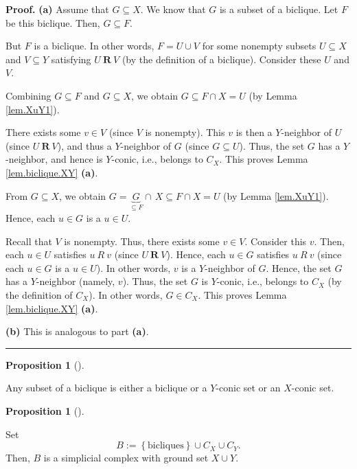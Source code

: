 \documentclass[numbers=enddot,12pt,final,onecolumn,notitlepage]{scrartcl}%
\theoremstyle{definition}
\newtheorem{prop}[theo]{Proposition}
\newenvironment{proposition}[1][]
{\begin{prop}[#1]\begin{leftbar}}
{\end{leftbar}\end{prop}}
\newenvironment{proof}[1][Proof]{\noindent\textbf{#1.} }{\ \rule{0.5em}{0.5em}}
\newenvironment{verlong}{}{}
\newenvironment{vershort}{}{}
\newenvironment{noncompile}{}{}
\begin{document}
\begin{proof}
\textbf{(a)} Assume that $G\subseteq X$. We know that $G$ is a subset of a
biclique. Let $F$ be this biclique. Then, $G\subseteq F$.

But $F$ is a biclique. In other words, $F=U\cup V$ for some nonempty subsets
$U\subseteq X$ and $V\subseteq Y$ satisfying $U\ \mathbf{R}\ V$ (by the
definition of a biclique). Consider these $U$ and $V$.

\begin{vershort}
Combining $G\subseteq F$ and $G\subseteq X$, we obtain $G\subseteq F\cap X=U$
(by Lemma \ref{lem.XuY1}).

There exists some $v\in V$ (since $V$ is nonempty). This $v$ is then a
$Y$-neighbor of $U$ (since $U\ \mathbf{R}\ V$), and thus a $Y$-neighbor of $G$
(since $G\subseteq U$). Thus, the set $G$ has a $Y$-neighbor, and hence is
$Y$-conic, i.e., belongs to $C_{X}$. This proves Lemma \ref{lem.biclique.XY}
\textbf{(a)}.
\end{vershort}

\begin{verlong}
From $G\subseteq X$, we obtain $G=\underbrace{G}_{\subseteq F}\cap\,X\subseteq
F\cap X=U$ (by Lemma \ref{lem.XuY1}). Hence, each $u\in G$ is a $u\in U$.

Recall that $V$ is nonempty. Thus, there exists some $v\in V$. Consider this
$v$. Then, each $u\in U$ satisfies $u\ R\ v$ (since $U\ \mathbf{R}\ V$).
Hence, each $u\in G$ satisfies $u\ R\ v$ (since each $u\in G$ is a $u\in U$).
In other words, $v$ is a $Y$-neighbor of $G$. Hence, the set $G$ has a
$Y$-neighbor (namely, $v$). Thus, the set $G$ is $Y$-conic, i.e., belongs to
$C_{X}$ (by the definition of $C_{X}$). In other words, $G\in C_{X}$. This
proves Lemma \ref{lem.biclique.XY} \textbf{(a)}.
\end{verlong}

\textbf{(b)} This is analogous to part \textbf{(a)}.
\end{proof}

\begin{noncompile}


\begin{proposition}
\label{prop.biclique.sub}Any subset of a biclique is either a biclique or a
$Y$-conic set or an $X$-conic set.
\end{proposition}
\end{noncompile}

\begin{proposition}
\label{prop.bicl-comp}Set%
\[
B:=\left\{  \text{bicliques}\right\}  \cup C_{X}\cup C_{Y}.
\]
Then, $B$ is a simplicial complex with ground set $X\cup Y$.
\end{proposition}
\end{document}
